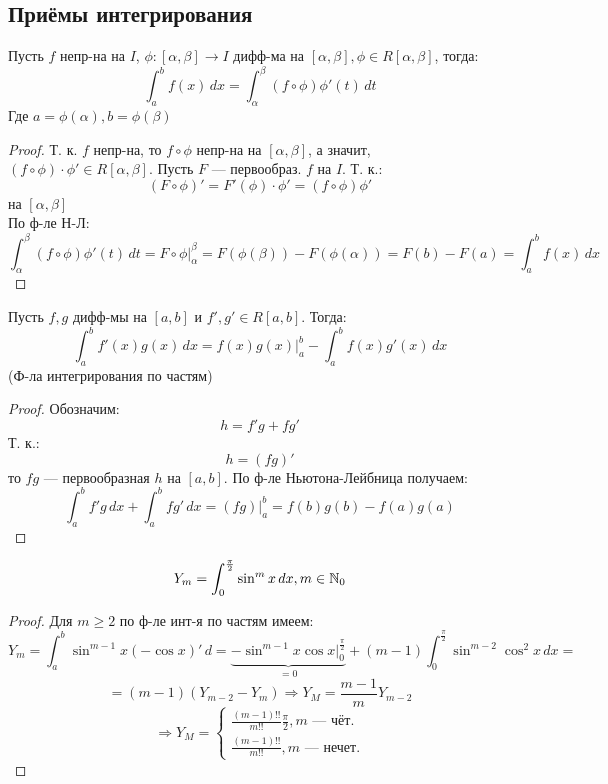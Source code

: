 \subsection{Приёмы интегрирования}
\begin{theorem}
\label{th:ways-of-integration(9)}
Пусть $f$ непр-на на $I$, $\phi \colon [\alpha, \beta] \rightarrow I$ дифф-ма на $[\alpha, \beta], \phi \in R[\alpha, \beta]$, тогда:
\[
\int_{a}^{b} f(x) \, dx = \int_{\alpha}^{\beta} (f \circ \phi) \phi'(t) \, dt
\]
Где $a = \phi(\alpha), b = \phi(\beta)$
\end{theorem}
\begin{proof}
Т. к. $f$ непр-на, то $f \circ \phi$ непр-на на $[\alpha, \beta]$, а значит, $(f \circ \phi) \cdot \phi' \in R[\alpha, \beta]$. Пусть $F$ --- первообраз. $f$ на $I$. Т. к.:
\[
  (F \circ \phi)' = F'(\phi) \cdot \phi' = (f \circ \phi) \phi'
\]
на $[\alpha, \beta]$ \\
По ф-ле Н-Л:
\[
  \int_{\alpha}^{\beta} (f \circ \phi) \phi'(t) \, dt = F \circ \phi \vert_{\alpha}^{\beta} = F(\phi(\beta)) - F(\phi(\alpha)) = F(b) - F(a) = \int_{a}^{b} f(x) \, dx
\]
\end{proof}
\begin{theorem}
\label{th:integration-by-parts(10)}
Пусть $f, g$ дифф-мы на $[a, b]$ и $f', g' \in R[a, b]$. Тогда:
\[
\int_{a}^{b} f'(x)g(x) \, dx = f(x)g(x)|_{a}^{b} - \int_{a}^{b} f(x)g'(x) \, dx
\]
(Ф-ла интегрирования по частям)
\end{theorem}
\begin{proof}
Обозначим:
\[
h = f'g + fg'
\]
Т. к.:
\[
h = (fg)'
\]
то $fg$ --- первообразная $h$ на $[a, b]$. По ф-ле Ньютона-Лейбница получаем:
\[
\int_{a}^{b} f'g \, dx + \int_{a}^{b} fg' \, dx = (fg)|_{a}^{b} = f(b)g(b) - f(a)g(a)
\]
\end{proof}
\begin{example}
  \[
    Y_m = \int_{0}^{\frac{\pi}{2}} \sin^{m}x \, dx, m \in \mathbb{N}_0
  \]
\end{example}
\begin{proof}
Для $m \geq 2$ по ф-ле инт-я по частям имеем:
\[
Y_m = \int_{a}^{b} \sin^{m - 1}x (-\cos x)' \, d = \underbrace{-\sin^{m - 1}x \cos x |_{0}^{\frac{\pi}{2}}}_{=0} + (m - 1)\int_{0}^{\frac{\pi}{2}} \sin^{m - 2}\cos^{2}x \, dx = 
\]
\[
 = (m - 1)(Y_{m - 2} - Y_m) \Rightarrow Y_M = \frac{m - 1}{m} Y_{m - 2}
\]
\[
 \Rightarrow Y_M = 
 \begin{cases}
 \frac{(m - 1)!!}{m!!} \frac{\pi}{2}, m \text{ --- чёт.} \\
 \frac{(m - 1)!!}{m!!}, m \text{ --- нечет.}
 \end{cases}
\]
\end{proof}
